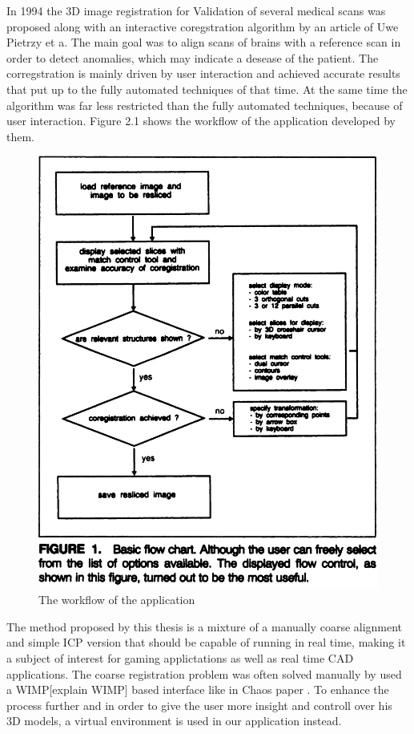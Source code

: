 \documentclass[hyperref,english,bachelorofscience,bibnum]{cgvpub}
\begin{document}
In 1994 the 3D image registration for Validation of several medical scans was proposed along with an interactive coregstration algorithm by an article of Uwe Pietrzy et a\cite{Pietrzyk1994}. The main goal was to align scans of brains with a reference scan in order to detect anomalies, which may indicate a desease of the patient. The corregstration is mainly driven by user interaction and achieved accurate results that put up to the fully automated techniques of that time. At the same time the algorithm was far less restricted than the fully automated techniques, because of user interaction. Figure 2.1 shows the workflow of the application developed by them.
\begin{figure}[htbp]
	\centering
		\includegraphics[width= \linewidth]{flow_chart_uwe_p.png}
	\caption{The workflow of the application\cite{Pietrzyk1994}}
	\label{fig:workflow}
\end{figure}

The method proposed by this thesis is a mixture of a manually coarse alignment and simple ICP version that should be capable of running in real time, making it a subject of interest for gaming applictations as well as real time CAD applications.
The coarse registration problem was often solved manually by used a WIMP[explain WIMP] based interface like in Chaos paper \cite{Chao}. To enhance the process further and in order to give the user more insight and controll over his 3D models, a virtual environment is used in our application instead.
\end{document}
